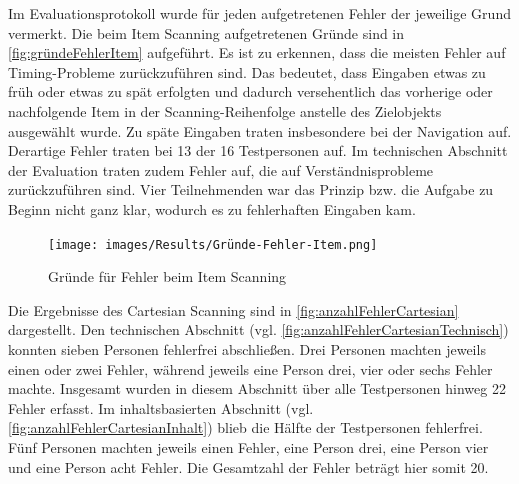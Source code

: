 Im Evaluationsprotokoll wurde für jeden aufgetretenen Fehler der jeweilige Grund vermerkt. Die beim Item Scanning aufgetretenen Gründe sind in \autoref{fig:gründeFehlerItem} aufgeführt. Es ist zu erkennen, dass die meisten Fehler auf Timing-Probleme zurückzuführen sind. Das bedeutet, dass Eingaben etwas zu früh oder etwas zu spät erfolgten und dadurch versehentlich das vorherige oder nachfolgende Item in der Scanning-Reihenfolge anstelle des Zielobjekts ausgewählt wurde. Zu späte Eingaben traten insbesondere bei der Navigation auf. Derartige Fehler traten bei 13 der 16 Testpersonen auf. Im technischen Abschnitt der Evaluation traten zudem Fehler auf, die auf Verständnisprobleme zurückzuführen sind. Vier Teilnehmenden war das Prinzip bzw. die Aufgabe zu Beginn nicht ganz klar, wodurch es zu fehlerhaften Eingaben kam. 

\begin{figure}[tbh]
    \centering
    \texttt{[image: images/Results/Gründe-Fehler-Item.png]}
    \caption{Gründe für Fehler beim Item Scanning}
    \label{fig:gründeFehlerItem}
\end{figure}

Die Ergebnisse des Cartesian Scanning sind in \autoref{fig:anzahlFehlerCartesian} dargestellt.
Den technischen Abschnitt (vgl. \autoref{fig:anzahlFehlerCartesianTechnisch}) konnten sieben Personen fehlerfrei abschließen. Drei Personen machten jeweils einen oder zwei Fehler, während jeweils eine Person drei, vier oder sechs Fehler machte. Insgesamt wurden in diesem Abschnitt über alle Testpersonen hinweg 22 Fehler erfasst. 
Im inhaltsbasierten Abschnitt (vgl. \autoref{fig:anzahlFehlerCartesianInhalt}) blieb die Hälfte der Testpersonen fehlerfrei. Fünf Personen machten jeweils einen Fehler, eine Person drei, eine Person vier und eine Person acht Fehler. Die Gesamtzahl der Fehler beträgt hier somit 20.

